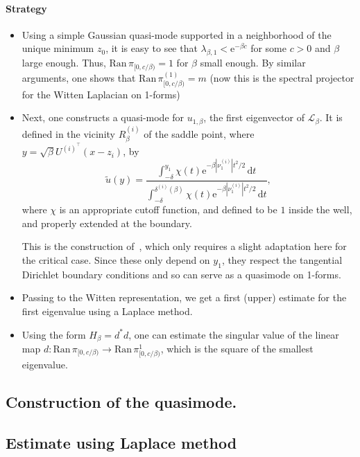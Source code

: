 \documentclass[10pt]{article}
\newcommand{\cL}{\mathcal{L}}
\renewcommand{\d}{\mathrm{d}}
\newcommand{\e}{\mathrm{e}}
\newcommand{\1}{\mathbbm 1}
\newcommand{\deltai }{\delta^{(i)}}
\begin{document}
        \paragraph{Strategy}
        \begin{itemize}
            \item{Using a simple Gaussian quasi-mode supported in a neighborhood of the unique minimum $z_0$, it is easy to see that 
            $\lambda_{\beta,1} < \e^{-\beta c}$ for some $c>0$ and $\beta$ large enough.
            Thus,
            $\mathrm{Ran}\,\pi_{[0,c/\beta)}=1$ for $\beta$ small enough. By similar arguments, one shows that $\mathrm{Ran}\,\pi^{(1)}_{[0,c/\beta)}= m$ (now this is the spectral projector for the Witten Laplacian on 1-forms)} 
            \item{
                Next, one constructs a quasi-mode for $u_{1,\beta}$, the first eigenvector of $\cL_\beta$. It is defined in the vicinity $R_\beta^(i)$ of the saddle point,
                where $y = \sqrt{\beta}{U^{(i)^\intercal}}(x-z_i)$, by
                $$\widetilde{u}(y) = \frac{\int_{-\delta}^{y_1}\chi(t)\e^{-\beta|\nu_1^{(i)}|t^2/2}\,\d t}{\int_{-\delta}^{\deltai(\beta) }\chi(t)\e^{-\beta|\nu_1^{(i)}|t^2/2}\,\d t},$$
                where $\chi$ is an appropriate cutoff function, and defined to be $1$ inside the well, and properly extended at the boundary.

                This is the construction of~\cite{LPN21}, which only requires a slight adaptation here for the critical case.
                Since these only depend on $y_1$, they respect the tangential Dirichlet boundary conditions and so can serve as a quasimode on 1-forms.
            }
            \item{
                Passing to the Witten representation, we get a first (upper) estimate for the first eigenvalue using a Laplace method.
            }
            \item{Using the form $H_\beta = d^*d$, one can estimate the singular value of the linear map $d : \mathrm{Ran}\,\pi_{[0,c/\beta)}\to \mathrm{Ran}\,\pi^{1}_{[0,c/\beta)}$}, which is the square of the smallest eigenvalue. 
        \end{itemize}

        \subsection{Construction of the quasimode.}

        \subsection{Estimate using Laplace method}
\end{document}
